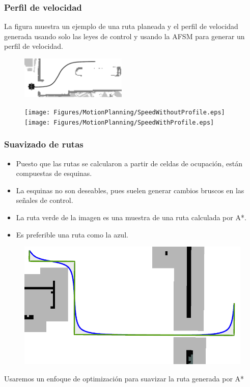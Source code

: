 \begin{frame}\frametitle{Perfil de velocidad}
  La figura muestra un ejemplo de una ruta planeada y el perfil de velocidad generada usando solo las leyes de control y usando la AFSM para generar un perfil de velocidad. 
  \begin{figure}
    \centering
    \includegraphics[width=0.45\textwidth]{Figures/MotionPlanning/SpeedProfilePath.png}
  \end{figure}
  \begin{figure}
    \centering
    \texttt{[image: Figures/MotionPlanning/SpeedWithoutProfile.eps]}
    \texttt{[image: Figures/MotionPlanning/SpeedWithProfile.eps]}
  \end{figure}
\end{frame}

\begin{frame}\frametitle{Suavizado de rutas}
  \begin{itemize}
  \item Puesto que las rutas se calcularon a partir de celdas de ocupación, están compuestas de esquinas.
  \item La esquinas no son deseables, pues suelen generar cambios bruscos en las señales de control.
  \item La ruta verde de la imagen es una muestra de una ruta calculada por A*.
  \item Es preferible una ruta como la azul. 
  \end{itemize}
  \begin{figure}
    \centering
    \includegraphics[height=0.45\textheight]{Figures/MotionPlanning/PathSmoothingExample.png}
  \end{figure}
  Usaremos un enfoque de optimización para suavizar la ruta generada por A*
\end{frame}

